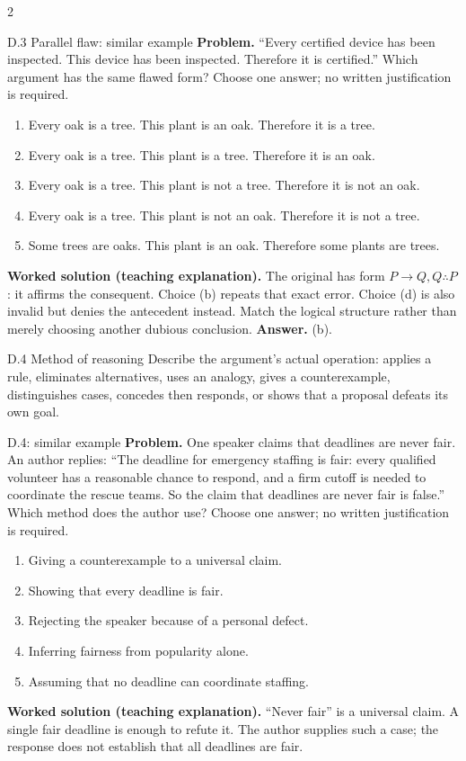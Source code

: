 \documentclass[10pt]{extarticle}
\begin{document}
\begin{multicols}{2}
\begin{methodbox}{D.3 Parallel flaw: similar example}
\textbf{Problem.} ``Every certified device has been inspected. This device has been inspected. Therefore it is certified.'' Which argument has the same flawed form? Choose one answer; no written justification is required.
\begin{enumerate}[label=(\alph*)]
\item Every oak is a tree. This plant is an oak. Therefore it is a tree.
\item Every oak is a tree. This plant is a tree. Therefore it is an oak.
\item Every oak is a tree. This plant is not a tree. Therefore it is not an oak.
\item Every oak is a tree. This plant is not an oak. Therefore it is not a tree.
\item Some trees are oaks. This plant is an oak. Therefore some plants are trees.
\end{enumerate}
\textbf{Worked solution (teaching explanation).} The original has form $P\to Q,Q\therefore P$: it affirms the consequent. Choice (b) repeats that exact error. Choice (d) is also invalid but denies the antecedent instead. Match the logical structure rather than merely choosing another dubious conclusion.
\textbf{Answer.} (b).
\end{methodbox}

\columnbreak
\begin{methodbox}{D.4 Method of reasoning}
Describe the argument's actual operation: applies a rule, eliminates alternatives,
uses an analogy, gives a counterexample, distinguishes cases, concedes then
responds, or shows that a proposal defeats its own goal.
\end{methodbox}
\begin{workedbox}{D.4: similar example}
\textbf{Problem.} One speaker claims that deadlines are never fair. An author replies: ``The deadline for emergency staffing is fair: every qualified volunteer has a reasonable chance to respond, and a firm cutoff is needed to coordinate the rescue teams. So the claim that deadlines are never fair is false.'' Which method does the author use? Choose one answer; no written justification is required.

\begin{enumerate}[label=(\alph*)]
\item Giving a counterexample to a universal claim.
\item Showing that every deadline is fair.
\item Rejecting the speaker because of a personal defect.
\item Inferring fairness from popularity alone.
\item Assuming that no deadline can coordinate staffing.
\end{enumerate}
\textbf{Worked solution (teaching explanation).} ``Never fair'' is a universal claim. A single fair deadline is enough to refute it. The author supplies such a case; the response does not establish that all deadlines are fair.


\end{workedbox}
\end{multicols}
\end{document}
